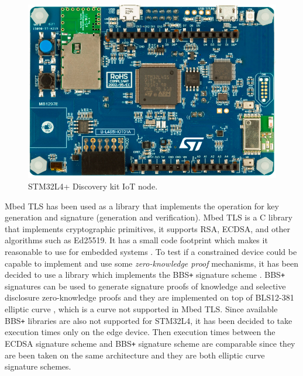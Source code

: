 \begin{figure}[h!]
    \centering
    \includegraphics[scale=0.30]{./chapters/images/STM32L4+ Discovery kit IoT node.jpeg}
    \caption{STM32L4+ Discovery kit IoT node\cite{stm32-board-product}.}
    \label{stm-board}
\end{figure}

Mbed TLS \cite{mbed-tls} has been used as a library that implements the operation for key generation and signature (generation and verification). Mbed TLS is a C library that implements cryptographic primitives, it supports RSA, ECDSA, and other algorithms such as Ed25519. It has a small code footprint which makes it reasonable to use for embedded systems \cite{mbed-tls}. To test if a constrained device could be capable to implement and use some \textit{zero-knowledge proof} mechanisms, it has been decided to use a library which implements the BBS\texttt{+} signature scheme \cite{bbsplus}. BBS\texttt{+} signatures can be used to generate signature proofs of knowledge and selective disclosure zero-knowledge proofs \cite{bbs-rust} and they are implemented on top of BLS12-381 elliptic curve \cite{bls-curve}, which is a curve not supported in Mbed TLS. Since available BBS\texttt{+} libraries are also not supported for STM32L4, it has been decided to take execution times only on the edge device. Then execution times between the ECDSA signature scheme and BBS\texttt{+} signature scheme are comparable since they are been taken on the same architecture and they are both elliptic curve signature schemes.


